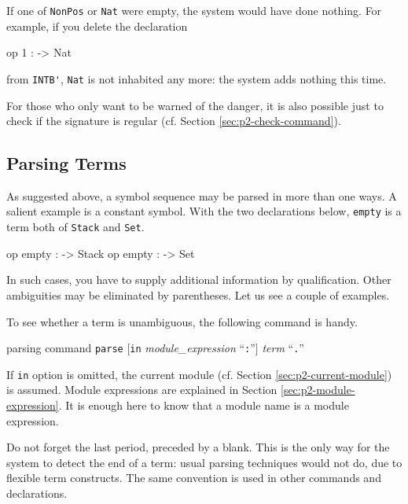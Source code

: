 \documentclass[a4paper]{memoir}
\begin{document}
If one of \verb|NonPos| or \verb|Nat| were empty, the system would have done
nothing. For example, if you delete the declaration
\begin{vvtm}
\begin{ccode}
  op 1 : -> Nat
\end{ccode}
\end{vvtm}
from \verb|INTB'|, \verb|Nat| is not inhabited any more: the system
adds nothing this time.

For those who only want to be warned
of the danger, it is also possible just to check if the signature is regular
(cf. Section \ref{sec:p2-check-command}).

\subsection{Parsing Terms}\label{sec:p2-parsing-qualifier}

As suggested above, a symbol sequence may be parsed in more than one ways.
A salient example is a constant symbol. With the two declarations below,
\verb|empty| is a term both of \verb|Stack| and \verb|Set|.
\begin{vvtm}
\begin{ccode}
  op empty : -> Stack
  op empty : -> Set
\end{ccode}
\end{vvtm}
In such cases, you have to supply additional information by qualification.
Other ambiguities may be eliminated by parentheses. Let us see a couple of
examples.

To see whether a term is unambiguous, the following command is handy.

\begin{bsyntax} parsing command  \Hline
{}
\texttt{parse} $[$\texttt{in} \textit{module\_expression} ``\texttt{:}''$]$ \textit{term} ``\texttt{.}''
\end{bsyntax}

If \verb|in| option is omitted, the current module
(cf. Section \ref{sec:p2-current-module}) is assumed. Module expressions
are explained in Section \ref{sec:p2-module-expression}. It is enough
here to know that a module name is a module expression.

\begin{warning}
  Do not forget the last period, preceded by a blank. This is the only
  way for the system to detect the end of a term: usual parsing techniques
  would not do, due to flexible term constructs. The same convention is
  used in other commands and declarations.
\end{warning}
\end{document}
